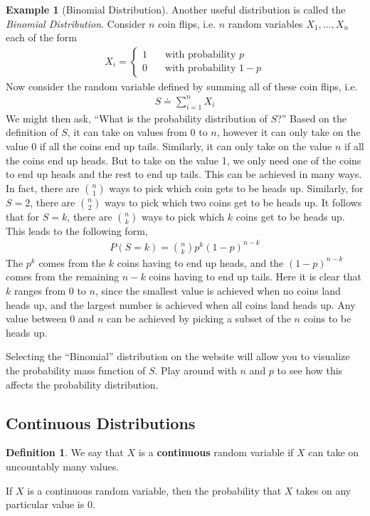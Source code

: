 \documentclass{tufte-book}
\theoremstyle{definition}
\numberwithin{theorem}{section}
\newtheorem{definition}[theorem]{Definition}
\numberwithin{definition}{section}
\numberwithin{lemma}{section}
\numberwithin{corollary}{section}
\numberwithin{proposition}{section}
\numberwithin{remark}{section}
\numberwithin{claim}{section}
\numberwithin{observation}{section}
\numberwithin{fact}{section}
\numberwithin{assumption}{section}
\newtheorem{example}[theorem]{Example}
\numberwithin{example}{section}
\numberwithin{exercise}{section}
\begin{document}
\begin{example}[Binomial Distribution]
Another useful distribution is called the \textit{Binomial Distribution}. Consider $n$ coin flips, i.e. $n$ random variables $X_1,\dots,X_n$ each of the form
\begin{align*}
X_i = \begin{cases}
1 \hspace{1em} &\text{with probability }p\\
0 &\text{with probability }1-p
\end{cases}
\end{align*}
Now consider the random variable defined by summing all of these coin flips, i.e.
\begin{align*}
S \doteq \sum_{i=1}^n X_i
\end{align*}
We might then ask, ``What is the probability distribution of $S$?'' Based on the definition of $S$, it can take on values from $0$ to $n$, however it can only take on the value 0 if all the coins end up tails. Similarly, it can only take on the value $n$ if all the coins end up heads. But to take on the value 1, we only need one of the coins to end up heads and the rest to end up tails. This can be achieved in many ways. In fact, there are $\binom{n}{1}$ ways to pick which coin gets to be heads up. Similarly, for $S = 2$, there are $\binom{n}{2}$ ways to pick which two coins get to be heads up. It follows that for $S = k$, there are $\binom{n}{k}$ ways to pick which $k$ coins get to be heads up. This leads to the following form,
\begin{align*}
P(S = k) = \binom{n}{k}p^k(1-p)^{n-k}
\end{align*}
The $p^k$ comes from the $k$ coins having to end up heads, and the $(1-p)^{n-k}$ comes from the remaining $n-k$ coins having to end up tails. Here it is clear that $k$ ranges from $0$ to $n$, since the smallest value is achieved when no coins land heads up, and the largest number is achieved when all coins land heads up. Any value between $0$ and $n$ can be achieved by picking a subset of the $n$ coins to be heads up.

Selecting the ``Binomial'' distribution on the website will allow you to visualize the probability mass function of $S$. Play around with $n$ and $p$ to see how this affects the probability distribution.
\end{example}

\subsection{Continuous Distributions}
\begin{definition}
We say that $X$ is a \textbf{continuous} random variable if $X$ can take on uncountably many values. 
\end{definition}
If $X$ is a continuous random variable, then the probability that $X$ takes on any particular value is 0. 
\end{document}
